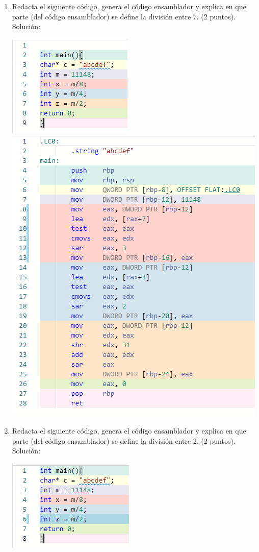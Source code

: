 \documentclass{article}
\begin{document}
\begin{enumerate}
        \item Redacta el siguiente código, genera el código ensamblador y explica en que parte (del código ensamblador) se define la división entre 7. (2 puntos).
        Solución: \\
        \begin{center}
		    \includegraphics[width=.4\textwidth]{Imagenes/ejercicio 3.png}
		    \includegraphics[width=.7\textwidth]{Imagenes/ejercicio 3.1.png}
		\end{center}\newpage
        \item Redacta el siguiente código, genera el código ensamblador y explica en que parte (del código
        ensamblador) se define la división entre 2. (2 puntos).
        Solución: \\
        \begin{center}
		    \includegraphics[width=.4\textwidth]{Imagenes/ejercicio 4.png}

\end{center}
\end{enumerate}
\end{document}
